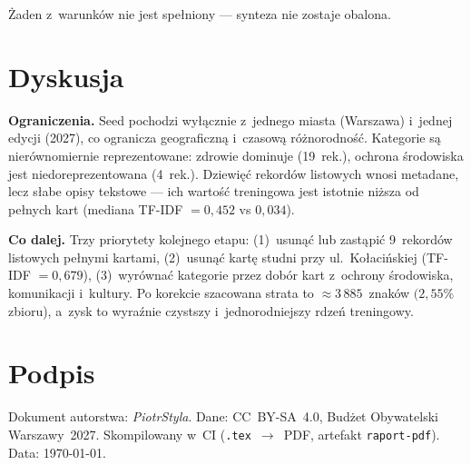 Żaden z~warunków nie jest spełniony --- synteza nie zostaje obalona.

\section{Dyskusja}

\textbf{Ograniczenia.} Seed pochodzi wyłącznie z~jednego miasta
(Warszawa) i~jednej edycji (2027), co ogranicza geograficzną
i~czasową różnorodność. Kategorie są nierównomiernie reprezentowane:
zdrowie dominuje (19~rek.), ochrona środowiska jest niedoreprezentowana
(4~rek.). Dziewięć rekordów listowych wnosi metadane, lecz słabe opisy
tekstowe --- ich wartość treningowa jest istotnie niższa od pełnych kart
(mediana TF-IDF $= 0{,}452$ vs $0{,}034$).

\textbf{Co dalej.} Trzy priorytety kolejnego etapu:
(1)~usunąć lub zastąpić 9~rekordów listowych pełnymi kartami,
(2)~usunąć kartę studni przy ul.~Kołacińskiej (TF-IDF $= 0{,}679$),
(3)~wyrównać kategorie przez dobór kart z~ochrony środowiska,
komunikacji i~kultury. Po korekcie szacowana strata to
$\approx 3\,885$~znaków $(2{,}55\%$ zbioru), a~zysk to
wyraźnie czystszy i~jednorodniejszy rdzeń treningowy.

\section*{Podpis}
Dokument autorstwa: \emph{PiotrStyla}. Dane: CC~BY-SA~4.0,
Budżet Obywatelski Warszawy~2027.
Skompilowany w~CI (\texttt{.tex}~$\to$~PDF, artefakt \texttt{raport-pdf}).
Data: \today.
